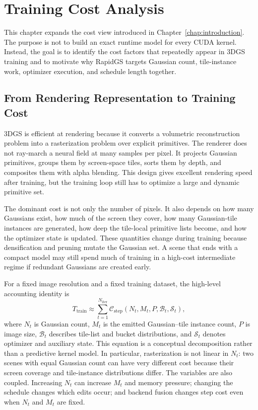 \chapter{Training Cost Analysis}
\label{chap:training-cost-analysis}

This chapter expands the cost view introduced in Chapter~\ref{chap:introduction}. The purpose is not to build an exact runtime model for every CUDA kernel. Instead, the goal is to identify the cost factors that repeatedly appear in 3DGS training and to motivate why RapidGS targets Gaussian count, tile-instance work, optimizer execution, and schedule length together.

\section{From Rendering Representation to Training Cost}

3DGS is efficient at rendering because it converts a volumetric reconstruction problem into a rasterization problem over explicit primitives. The renderer does not ray-march a neural field at many samples per pixel. It projects Gaussian primitives, groups them by screen-space tiles, sorts them by depth, and composites them with alpha blending. This design gives excellent rendering speed after training, but the training loop still has to optimize a large and dynamic primitive set.

The dominant cost is not only the number of pixels. It also depends on how many Gaussians exist, how much of the screen they cover, how many Gaussian-tile instances are generated, how deep the tile-local primitive lists become, and how the optimizer state is updated. These quantities change during training because densification and pruning mutate the Gaussian set. A scene that ends with a compact model may still spend much of training in a high-cost intermediate regime if redundant Gaussians are created early.

For a fixed image resolution and a fixed training dataset, the high-level accounting identity is
\begin{equation}
T_{\mathrm{train}}
\approx
\sum_{t=1}^{N_{\mathrm{iter}}}
\mathcal{C}_{\mathrm{step}}(N_t,M_t,P,\mathcal{B}_t,\mathcal{S}_t),
\end{equation}
where $N_t$ is Gaussian count, $M_t$ is the emitted Gaussian--tile instance count, $P$ is image size, $\mathcal{B}_t$ describes tile-list and bucket distributions, and $\mathcal{S}_t$ denotes optimizer and auxiliary state. This equation is a conceptual decomposition rather than a predictive kernel model. In particular, rasterization is not linear in $N_t$: two scenes with equal Gaussian count can have very different cost because their screen coverage and tile-instance distributions differ. The variables are also coupled. Increasing $N_t$ can increase $M_t$ and memory pressure; changing the schedule changes which edits occur; and backend fusion changes step cost even when $N_t$ and $M_t$ are fixed.

